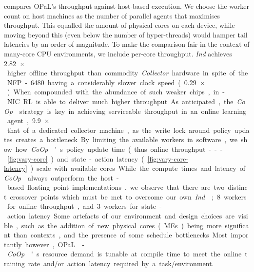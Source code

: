 \documentclass[
sigconf,natbib=false
]{acmart}
\newcommand{\approachshort}{OPaL}
\newcommand{\Coopfw}{\emph{CoOp}}
\newcommand{\Indfw}{\emph{Ind}}
\begin{document}
 compares \approachshort{}'s throughput against host-based execution.
We choose the worker count on host machines as the number of parallel agents that maximises throughput.
This equalled the amount of physical cores on each device, while moving beyond this (even below the number of hyper-threads) would hamper tail latencies by an order of magnitude.
To make the comparison fair in the context of many-core CPU environments, we include per-core throughput.
\Indfw{} achieves \SI{2.82}{$\times$} higher offline throughput than commodity \emph{Collector} hardware in spite of the NFP-6480 having a considerably slower clock speed (\SI{0.29}{$\times$}).
When compounded with the abundance of such weaker chips, in-NIC RL is able to deliver much higher throughput.
As anticipated, the \Coopfw{} strategy is key in achieving serviceable throughput in an online learning agent, \SI{9.9}{$\times$} that of a dedicated collector machine, as the write lock around policy updates creates a bottleneck.

By limiting the available workers in software, we show how \Coopfw{}'s policy update time (thus  online throughput---\cref{fig:vary-core}) and state-action latency (\cref{fig:vary-core-latency}) scale with available cores.
While the compute times and latency of \Coopfw{} always outperform the host-based floating point implementations, we observe that there are two distinct crossover points which must be met to overcome our own \Indfw{}; \num{8} workers for online throughput, and \num{3} workers for state-action latency.
Some artefacts of our environment and design choices are visible, such as the addition of new physical cores (MEs) being more significant than contexts, and the presence of some schedule bottlenecks.
Most importantly however, \approachshort{}-\Coopfw{}'s resource demand is tunable at compile time to meet the online training rate and/or action latency required by a task/environment.
\end{document}

